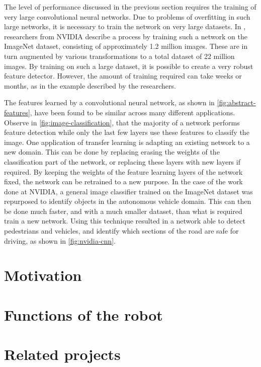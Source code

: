 \documentclass[\rootfolder/main.tex]{subfiles}
\begin{document}
The level of performance discussed in the previous section requires the training of very large convolutional neural networks.
Due to problems of overfitting in such large networks, it is necessary to train the network on very large datasets.
In \cite{NVIDIA}, researchers from NVIDIA describe a process by training such a network on the ImageNet dataset, consisting of approximately 1.2 million images.
These are in turn augmented by various transformations to a total dataset of 22 million images.
By training on such a large dataset, it is possible to create a very robust feature detector.
However, the amount of training required can take weeks or months, as in the example described by the researchers.

The features learned by a convolutional neural network, as shown in \cref{fig:abstract-features}, have been found to be similar across many different applications.
Observe in \cref{fig:image-classification}, that the majority of a network performs feature detection while only the last few layers use these features to classify the image.
One application of transfer learning is adapting an existing network to a new domain.
This can be done by replacing erasing the weights of the classification part of the network, or replacing these layers with new layers if required.
By keeping the weights of the feature learning layers of the network fixed, the network can be retrained to a new purpose.
In the case of the work done at NVIDIA, a general image classifier trained on the ImageNet dataset was repurposed to identify objects in the autonomous vehicle domain.
This can then be done much faster, and with a much smaller dataset, than what is required train a new network.
Using this technique resulted in a network able to detect pedestrians and vehicles, and identify which sections of the road are safe for driving, as shown in \cref{fig:nvidia-cnn}.


\section{Motivation}

\section{Functions of the robot}

\section{Related projects}
\end{document}
